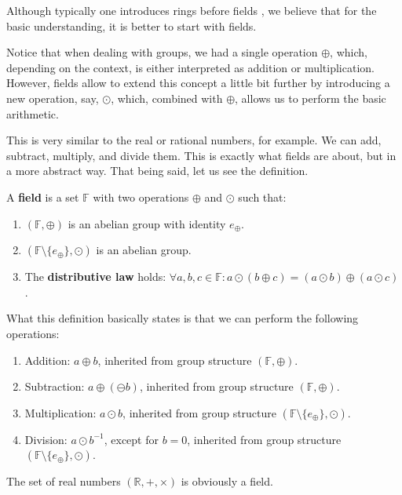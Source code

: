 \documentclass[../lecture-notes-148x210.tex]{subfiles}
\begin{document}
Although typically one introduces rings before fields \cite[section 16]{Judson_2012}, we believe that for the 
basic understanding, it is better to start with fields. 

Notice that when dealing with groups, we had a single operation $\oplus$, which, depending on the context, is either 
interpreted as addition or multiplication. However, fields allow to extend this concept a little bit further by 
introducing a new operation, say, $\odot$, which, combined with $\oplus$, allows us to perform the basic arithmetic.

This is very similar to the real or rational numbers, for example. We can add, subtract, multiply, and divide them. 
This is exactly what fields are about, but in a more abstract way. That being said, let us see the definition.

\begin{definition}
    A \textbf{field} is a set $\mathbb{F}$ with two operations $\oplus$ and $\odot$ such that:
    \begin{enumerate}
        \item $(\mathbb{F}, \oplus)$ is an abelian group with identity $e_{\oplus}$.
        \item $(\mathbb{F} \setminus \{e_{\oplus}\}, \odot)$ is an abelian group.
        \item The \textbf{distributive law} holds: $\forall a,b,c \in \mathbb{F}: a \odot (b \oplus c) = (a \odot b) \oplus (a \odot c)$.
    \end{enumerate}
\end{definition}

What this definition basically states is that we can perform the following operations:
\begin{enumerate}
    \item Addition: $a \oplus b$, inherited from group structure $(\mathbb{F}, \oplus)$.
    \item Subtraction: $a \oplus (\ominus b)$, inherited from group structure $(\mathbb{F}, \oplus)$.
    \item Multiplication: $a \odot b$, inherited from group structure $(\mathbb{F} \setminus \{e_{\oplus}\}, \odot)$.
    \item Division: $a \odot b^{-1}$, except for $b=0$, inherited from group structure $(\mathbb{F} \setminus \{e_{\oplus}\}, \odot)$.
\end{enumerate}

\begin{example}
    The set of real numbers $(\mathbb{R}, +, \times)$ is obviously a field.
\end{example}
\end{document}
